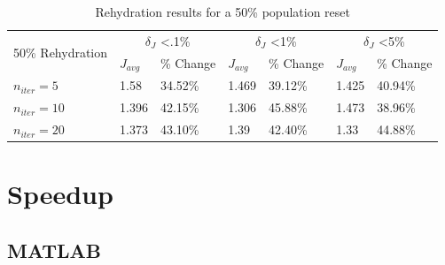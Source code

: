 \begin{table}[H]
    \centering
    \begin{tabular}{lll|ll|ll}
      \toprule
      \multirow{2}{*}{50\% Rehydration} &
        \multicolumn{2}{c}{$\delta_{J}$ \textless .1\%} &
        \multicolumn{2}{c}{$\delta_{J}$ \textless 1\%} &
        \multicolumn{2}{c}{$\delta_{J}$ \textless 5\%} \\
        \cmidrule{2-7}
      & $J_{avg}$ & \% Change & $J_{avg}$ & \% Change & $J_{avg}$ & \% Change \\
      \midrule

      $n_{iter}=5$ & 1.58 & 34.52\% & 1.469 & 39.12\% & 1.425 & 40.94\% \\
      $n_{iter}=10$ & 1.396 & 42.15\% & 1.306 & 45.88\% & 1.473 & 38.96\% \\
      $n_{iter}=20$ & 1.373 & 43.10\% & 1.39 & 42.40\% & 1.33 & 44.88\% \\
      \bottomrule
    \end{tabular}
    \caption{Rehydration results for a 50\% population reset}
    \label{tab:rehydation-p50}
  \end{table}

\section{Speedup}

\subsection{MATLAB}

